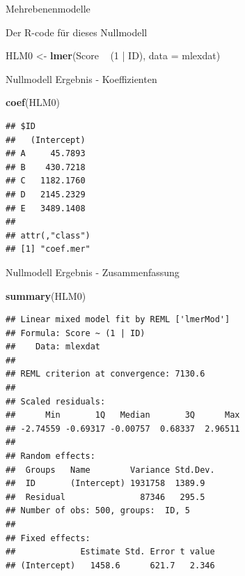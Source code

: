 \documentclass[ignorenonframetext,]{beamer}
\newenvironment{Shaded}{}{}
\newcommand{\KeywordTok}[1]{\textcolor[rgb]{0.00,0.44,0.13}{\textbf{{#1}}}}
\newcommand{\DataTypeTok}[1]{\textcolor[rgb]{0.56,0.13,0.00}{{#1}}}
\newcommand{\DecValTok}[1]{\textcolor[rgb]{0.25,0.63,0.44}{{#1}}}
\newcommand{\StringTok}[1]{\textcolor[rgb]{0.25,0.44,0.63}{{#1}}}
\newcommand{\NormalTok}[1]{{#1}}
\begin{document}
\begin{frame}[fragile]{Mehrebenenmodelle}
\begin{block}{Der R-code für dieses Nullmodell}
\begin{Shaded}
\begin{Highlighting}[]
\NormalTok{HLM0 <-}\StringTok{ }\KeywordTok{lmer}\NormalTok{(Score ~}\StringTok{ }\NormalTok{(}\DecValTok{1} \NormalTok{|}\StringTok{ }\NormalTok{ID), }\DataTypeTok{data =} \NormalTok{mlexdat)}
\end{Highlighting}
\end{Shaded}

\end{block}

\begin{block}{Nullmodell Ergebnis - Koeffizienten}

\begin{Shaded}
\begin{Highlighting}[]
\KeywordTok{coef}\NormalTok{(HLM0)}
\end{Highlighting}
\end{Shaded}

\begin{verbatim}
## $ID
##   (Intercept)
## A     45.7893
## B    430.7218
## C   1182.1760
## D   2145.2329
## E   3489.1408
## 
## attr(,"class")
## [1] "coef.mer"
\end{verbatim}

\end{block}

\begin{block}{Nullmodell Ergebnis - Zusammenfassung}

\begin{Shaded}
\begin{Highlighting}[]
\KeywordTok{summary}\NormalTok{(HLM0)}
\end{Highlighting}
\end{Shaded}

\begin{verbatim}
## Linear mixed model fit by REML ['lmerMod']
## Formula: Score ~ (1 | ID)
##    Data: mlexdat
## 
## REML criterion at convergence: 7130.6
## 
## Scaled residuals: 
##      Min       1Q   Median       3Q      Max 
## -2.74559 -0.69317 -0.00757  0.68337  2.96511 
## 
## Random effects:
##  Groups   Name        Variance Std.Dev.
##  ID       (Intercept) 1931758  1389.9  
##  Residual               87346   295.5  
## Number of obs: 500, groups:  ID, 5
## 
## Fixed effects:
##             Estimate Std. Error t value
## (Intercept)   1458.6      621.7   2.346
\end{verbatim}

\end{block}


\end{frame}
\end{document}
